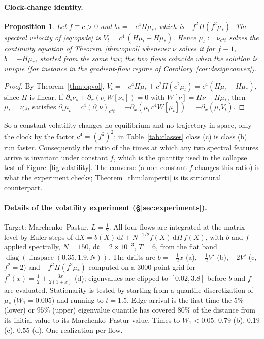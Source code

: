 \documentclass[11pt]{article}
\theoremstyle{plain}
\newtheorem{proposition}[theorem]{Proposition}
\theoremstyle{definition}
\theoremstyle{remark}
\begin{document}
\paragraph{Clock-change identity.} \begin{proposition}\label{prop:clock}
Let $f\equiv c>0$ and $b_*=-c^4H\mu_*$, which is $-f^2H(f^2\mu_*)$. The spectral
velocity of \eqref{eq:opsde} is $V_t=c^4\,(H\mu_t-H\mu_*)$. Hence $\mu_t:=\nu_{c^4t}$ solves
the continuity equation of Theorem~\ref{thm:opvol} whenever $\nu$ solves it for $f\equiv1$,
$b=-H\mu_*$, started from the same law; the two flows coincide when the solution is unique
(for instance in the gradient-flow regime of Corollary~\ref{cor:designconvex}).
\end{proposition}
\begin{proof}
By Theorem~\ref{thm:opvol}, $V_t=-c^4H\mu_*+c^2H(c^2\mu_t)=c^4(H\mu_t-H\mu_*)$, since $H$ is
linear. If $\partial_s\nu_s+\partial_x(\nu_sW[\nu_s])=0$ with $W[\nu]=H\nu-H\mu_*$, then
$\mu_t=\nu_{c^4t}$ satisfies $\partial_t\mu_t=c^4(\partial_s\nu)_{c^4t}=-\partial_x(\mu_t\,c^4W[\mu_t])=-\partial_x(\mu_tV_t)$.
\end{proof}
So a constant volatility changes no equilibrium and no trajectory in space, only the clock by the
factor $c^4=(f^2)^2$; in Table~\ref{tab:classes} class (c) is class (b) run faster.
Consequently the ratio of the times at which any two spectral features arrive is invariant under constant $f$, which is
the quantity used in the collapse test of Figure~\ref{fig:volatility}. The converse (a non-constant $f$
changes this ratio) is what the experiment checks; Theorem~\ref{thm:lamperti} is its structural counterpart.

\paragraph{Details of the volatility experiment (\S\ref{sec:experiments}).} Target: Marchenko--Pastur,
$L=\tfrac12$. All four flows are integrated at the matrix level by Euler steps of
$\mathrm dX=b(X)\,\mathrm dt+N^{-1/2}f(X)\,\mathrm dH\,f(X)$, with $b$ and $f$ applied spectrally,
$N=150$, $\mathrm dt=2\times10^{-3}$, $T=6$, from the flat band $\operatorname{diag}(\operatorname{linspace}(0.35,1.9,N))$.
The drifts are $b=-\tfrac12x$ (a), $-\tfrac12V'$ (b), $-2V'$ (c, $f^2=2$) and
$-f^2H(f^2\mu_*)$ computed on a $3000$-point grid for $f^2(x)=\tfrac12+\tfrac{3x}{2(1+x)}$ (d);
eigenvalues are clipped to $[0.02,3.8]$ before $b$ and $f$ are evaluated. Stationarity is tested by
starting from a quantile discretization of $\mu_*$ ($W_1=0.005$) and running to $t=1.5$. Edge arrival is the first
time the $5\%$ (lower) or $95\%$ (upper) eigenvalue quantile has covered $80\%$ of the distance from its
initial value to its Marchenko--Pastur value. Times to $W_1<0.05$: $0.79$ (b), $0.19$ (c), $0.55$ (d). One realization per flow.
\end{document}
